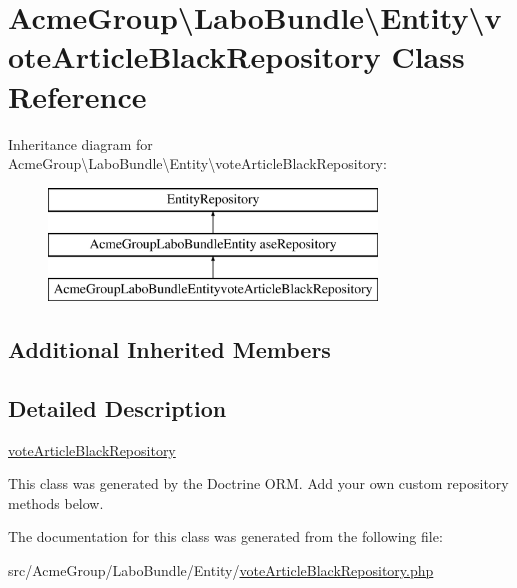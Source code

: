 \hypertarget{class_acme_group_1_1_labo_bundle_1_1_entity_1_1vote_article_black_repository}{\section{Acme\+Group\textbackslash{}Labo\+Bundle\textbackslash{}Entity\textbackslash{}vote\+Article\+Black\+Repository Class Reference}
\label{class_acme_group_1_1_labo_bundle_1_1_entity_1_1vote_article_black_repository}
}
Inheritance diagram for Acme\+Group\textbackslash{}Labo\+Bundle\textbackslash{}Entity\textbackslash{}vote\+Article\+Black\+Repository\+:\begin{figure}[H]
\begin{center}
\leavevmode
\includegraphics[height=3.000000cm]{class_acme_group_1_1_labo_bundle_1_1_entity_1_1vote_article_black_repository}
\end{center}
\end{figure}
\subsection*{Additional Inherited Members}


\subsection{Detailed Description}
\hyperlink{class_acme_group_1_1_labo_bundle_1_1_entity_1_1vote_article_black_repository}{vote\+Article\+Black\+Repository}

This class was generated by the Doctrine O\+R\+M. Add your own custom repository methods below. 

The documentation for this class was generated from the following file\+:\begin{DoxyCompactItemize}
\item 
src/\+Acme\+Group/\+Labo\+Bundle/\+Entity/\hyperlink{vote_article_black_repository_8php}{vote\+Article\+Black\+Repository.\+php}\end{DoxyCompactItemize}
